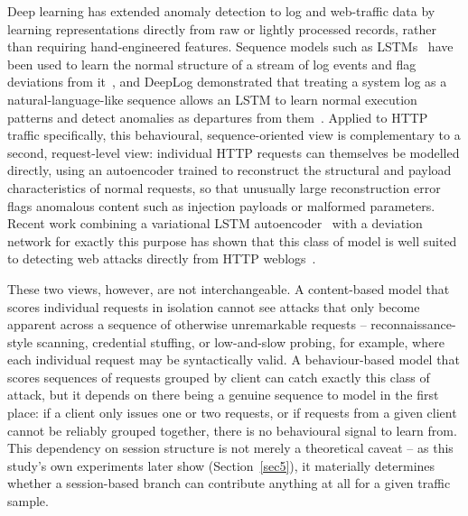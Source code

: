 \documentclass[futureinternet,article,submit,moreauthors]{Definitions/mdpi}
\begin{document}
Deep learning has extended anomaly detection to log and web-traffic data by learning representations directly from raw or lightly processed records, rather than requiring hand-engineered features. Sequence models such as LSTMs~\cite{hochreiter1997} have been used to learn the normal structure of a stream of log events and flag deviations from it~\cite{nedelkoski2020}, and DeepLog demonstrated that treating a system log as a natural-language-like sequence allows an LSTM to learn normal execution patterns and detect anomalies as departures from them~\cite{du2017}. Applied to HTTP traffic specifically, this behavioural, sequence-oriented view is complementary to a second, request-level view: individual HTTP requests can themselves be modelled directly, using an autoencoder trained to reconstruct the structural and payload characteristics of normal requests, so that unusually large reconstruction error flags anomalous content such as injection payloads or malformed parameters. Recent work combining a variational LSTM autoencoder~\cite{kingma2014,ancho2015} with a deviation network for exactly this purpose has shown that this class of model is well suited to detecting web attacks directly from HTTP weblogs~\cite{jagat2024}.

These two views, however, are not interchangeable. A content-based model that scores individual requests in isolation cannot see attacks that only become apparent across a sequence of otherwise unremarkable requests -- reconnaissance-style scanning, credential stuffing, or low-and-slow probing, for example, where each individual request may be syntactically valid. A behaviour-based model that scores sequences of requests grouped by client can catch exactly this class of attack, but it depends on there being a genuine sequence to model in the first place: if a client only issues one or two requests, or if requests from a given client cannot be reliably grouped together, there is no behavioural signal to learn from. This dependency on session structure is not merely a theoretical caveat -- as this study's own experiments later show (Section~\ref{sec5}), it materially determines whether a session-based branch can contribute anything at all for a given traffic sample.
\end{document}
